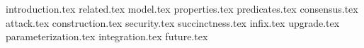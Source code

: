 {introduction.tex}
{related.tex}
{model.tex}
{properties.tex}
{predicates.tex}
{consensus.tex}
{attack.tex}
{construction.tex}
{security.tex}
{succinctness.tex}
{infix.tex}
{upgrade.tex}
{parameterization.tex}
{integration.tex}
{future.tex}

